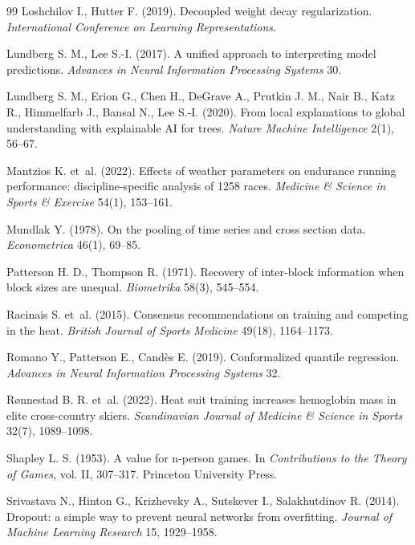 \documentclass[11pt,a4paper]{article}
\begin{document}
\begin{thebibliography}{99}
Loshchilov I., Hutter F. (2019). Decoupled weight decay regularization. \emph{International Conference on Learning
Representations}.

Lundberg S. M., Lee S.-I. (2017). A unified approach to interpreting model predictions. \emph{Advances in Neural
Information Processing Systems} 30.

Lundberg S. M., Erion G., Chen H., DeGrave A., Prutkin J. M., Nair B., Katz R., Himmelfarb J., Bansal N., Lee S.-I.
(2020). From local explanations to global understanding with explainable AI for trees. \emph{Nature Machine
Intelligence} 2(1), 56--67.

Mantzios K. et~al. (2022). Effects of weather parameters on endurance running performance: discipline-specific
analysis of 1258 races. \emph{Medicine \& Science in Sports \& Exercise} 54(1), 153--161.

Mundlak Y. (1978). On the pooling of time series and cross section data. \emph{Econometrica} 46(1), 69--85.

Patterson H. D., Thompson R. (1971). Recovery of inter-block information when block sizes are unequal.
\emph{Biometrika} 58(3), 545--554.

Racinais S. et~al. (2015). Consensus recommendations on training and competing in the heat. \emph{British Journal of
Sports Medicine} 49(18), 1164--1173.

Romano Y., Patterson E., Candès E. (2019). Conformalized quantile regression. \emph{Advances in Neural Information
Processing Systems} 32.

Rønnestad B. R. et~al. (2022). Heat suit training increases hemoglobin mass in elite cross-country skiers.
\emph{Scandinavian Journal of Medicine \& Science in Sports} 32(7), 1089--1098.

Shapley L. S. (1953). A value for n-person games. In \emph{Contributions to the Theory of Games}, vol. II, 307--317.
Princeton University Press.

Srivastava N., Hinton G., Krizhevsky A., Sutskever I., Salakhutdinov R. (2014). Dropout: a simple way to prevent
neural networks from overfitting. \emph{Journal of Machine Learning Research} 15, 1929--1958.


\end{thebibliography}
\end{document}
